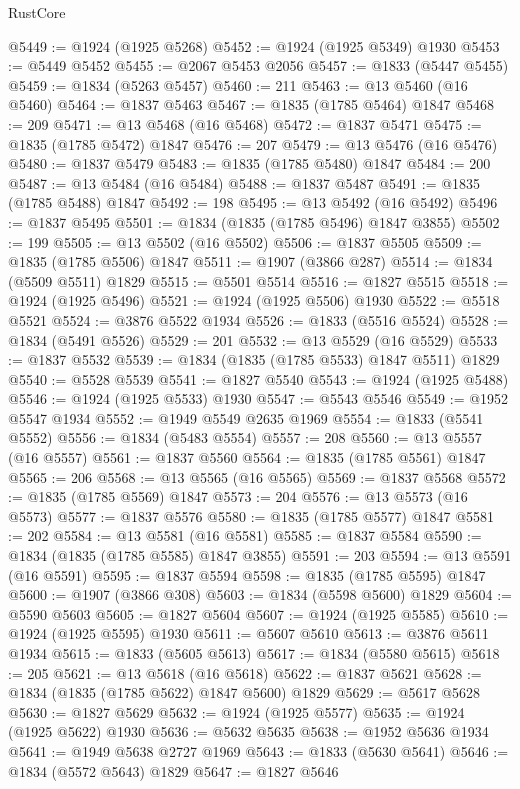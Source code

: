 \begin{lexlean}{RustCore}
\begin{coremodule}
@5449 := @1924 (@1925 @5268)
@5452 := @1924 (@1925 @5349) @1930
@5453 := @5449 @5452
@5455 := @2067 @5453 @2056
@5457 := @1833 (@5447 @5455)
@5459 := @1834 (@5263 @5457)
@5460 := 211
@5463 := @13 @5460 (@16 @5460)
@5464 := @1837 @5463
@5467 := @1835 (@1785 @5464) @1847
@5468 := 209
@5471 := @13 @5468 (@16 @5468)
@5472 := @1837 @5471
@5475 := @1835 (@1785 @5472) @1847
@5476 := 207
@5479 := @13 @5476 (@16 @5476)
@5480 := @1837 @5479
@5483 := @1835 (@1785 @5480) @1847
@5484 := 200
@5487 := @13 @5484 (@16 @5484)
@5488 := @1837 @5487
@5491 := @1835 (@1785 @5488) @1847
@5492 := 198
@5495 := @13 @5492 (@16 @5492)
@5496 := @1837 @5495
@5501 := @1834 (@1835 (@1785 @5496) @1847 @3855)
@5502 := 199
@5505 := @13 @5502 (@16 @5502)
@5506 := @1837 @5505
@5509 := @1835 (@1785 @5506) @1847
@5511 := @1907 (@3866 @287)
@5514 := @1834 (@5509 @5511) @1829
@5515 := @5501 @5514
@5516 := @1827 @5515
@5518 := @1924 (@1925 @5496)
@5521 := @1924 (@1925 @5506) @1930
@5522 := @5518 @5521
@5524 := @3876 @5522 @1934
@5526 := @1833 (@5516 @5524)
@5528 := @1834 (@5491 @5526)
@5529 := 201
@5532 := @13 @5529 (@16 @5529)
@5533 := @1837 @5532
@5539 := @1834 (@1835 (@1785 @5533) @1847 @5511) @1829
@5540 := @5528 @5539
@5541 := @1827 @5540
@5543 := @1924 (@1925 @5488)
@5546 := @1924 (@1925 @5533) @1930
@5547 := @5543 @5546
@5549 := @1952 @5547 @1934
@5552 := @1949 @5549 @2635 @1969
@5554 := @1833 (@5541 @5552)
@5556 := @1834 (@5483 @5554)
@5557 := 208
@5560 := @13 @5557 (@16 @5557)
@5561 := @1837 @5560
@5564 := @1835 (@1785 @5561) @1847
@5565 := 206
@5568 := @13 @5565 (@16 @5565)
@5569 := @1837 @5568
@5572 := @1835 (@1785 @5569) @1847
@5573 := 204
@5576 := @13 @5573 (@16 @5573)
@5577 := @1837 @5576
@5580 := @1835 (@1785 @5577) @1847
@5581 := 202
@5584 := @13 @5581 (@16 @5581)
@5585 := @1837 @5584
@5590 := @1834 (@1835 (@1785 @5585) @1847 @3855)
@5591 := 203
@5594 := @13 @5591 (@16 @5591)
@5595 := @1837 @5594
@5598 := @1835 (@1785 @5595) @1847
@5600 := @1907 (@3866 @308)
@5603 := @1834 (@5598 @5600) @1829
@5604 := @5590 @5603
@5605 := @1827 @5604
@5607 := @1924 (@1925 @5585)
@5610 := @1924 (@1925 @5595) @1930
@5611 := @5607 @5610
@5613 := @3876 @5611 @1934
@5615 := @1833 (@5605 @5613)
@5617 := @1834 (@5580 @5615)
@5618 := 205
@5621 := @13 @5618 (@16 @5618)
@5622 := @1837 @5621
@5628 := @1834 (@1835 (@1785 @5622) @1847 @5600) @1829
@5629 := @5617 @5628
@5630 := @1827 @5629
@5632 := @1924 (@1925 @5577)
@5635 := @1924 (@1925 @5622) @1930
@5636 := @5632 @5635
@5638 := @1952 @5636 @1934
@5641 := @1949 @5638 @2727 @1969
@5643 := @1833 (@5630 @5641)
@5646 := @1834 (@5572 @5643) @1829
@5647 := @1827 @5646

\end{coremodule}
\end{lexlean}
